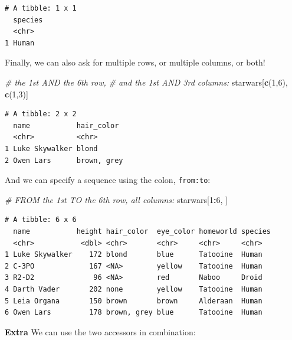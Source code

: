 \documentclass[]{book}
\newenvironment{Shaded}{\begin{snugshade}}{\end{snugshade}}
\newcommand{\CommentTok}[1]{\textcolor[rgb]{0.56,0.35,0.01}{\textit{#1}}}
\newcommand{\DecValTok}[1]{\textcolor[rgb]{0.00,0.00,0.81}{#1}}
\newcommand{\KeywordTok}[1]{\textcolor[rgb]{0.13,0.29,0.53}{\textbf{#1}}}
\newcommand{\NormalTok}[1]{#1}
\newcommand{\OperatorTok}[1]{\textcolor[rgb]{0.81,0.36,0.00}{\textbf{#1}}}
\begin{document}
\begin{verbatim}
# A tibble: 1 x 1
  species
  <chr>  
1 Human  
\end{verbatim}

Finally, we can also ask for multiple rows, or multiple columns, or both!

\begin{Shaded}
\begin{Highlighting}[]
\CommentTok{# the 1st AND the 6th row, }
\CommentTok{# and the 1st AND 3rd columns:}
\NormalTok{starwars[}\KeywordTok{c}\NormalTok{(}\DecValTok{1}\NormalTok{,}\DecValTok{6}\NormalTok{), }\KeywordTok{c}\NormalTok{(}\DecValTok{1}\NormalTok{,}\DecValTok{3}\NormalTok{)]}
\end{Highlighting}
\end{Shaded}

\begin{verbatim}
# A tibble: 2 x 2
  name           hair_color 
  <chr>          <chr>      
1 Luke Skywalker blond      
2 Owen Lars      brown, grey
\end{verbatim}

And we can specify a sequence using the colon, \texttt{from:to}:

\begin{Shaded}
\begin{Highlighting}[]
\CommentTok{# FROM the 1st TO the 6th row, all columns:}
\NormalTok{starwars[}\DecValTok{1}\OperatorTok{:}\DecValTok{6}\NormalTok{, ]}
\end{Highlighting}
\end{Shaded}

\begin{verbatim}
# A tibble: 6 x 6
  name           height hair_color  eye_color homeworld species
  <chr>           <dbl> <chr>       <chr>     <chr>     <chr>  
1 Luke Skywalker    172 blond       blue      Tatooine  Human  
2 C-3PO             167 <NA>        yellow    Tatooine  Human  
3 R2-D2              96 <NA>        red       Naboo     Droid  
4 Darth Vader       202 none        yellow    Tatooine  Human  
5 Leia Organa       150 brown       brown     Alderaan  Human  
6 Owen Lars         178 brown, grey blue      Tatooine  Human  
\end{verbatim}

\textbf{Extra}
We can use the two accessors in combination:

\begin{Shaded}
\end{Shaded}
\end{document}

